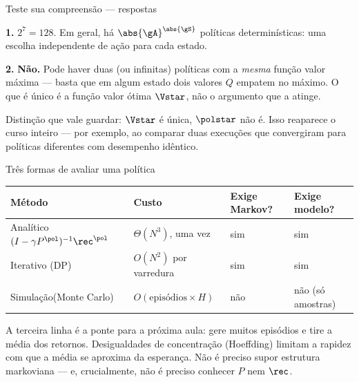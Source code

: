 \documentclass[aspectratio=169, 11pt]{beamer}
\begin{document}
\begin{frame}{Teste sua compreensão --- respostas}
  \begin{respbox}
    \textbf{1.} $2^7 = 128$. Em geral, há $\abs{\gA}^{\abs{\gS}}$ políticas
    determinísticas: uma escolha independente de ação para cada estado.

    \smallskip
    \textbf{2.} \textbf{Não.} Pode haver duas (ou infinitas) políticas com a
    \emph{mesma} função valor máxima --- basta que em algum estado dois valores $Q$
    empatem no máximo. O que é único é a \alert{função valor ótima} $\Vstar$, não o
    argumento que a atinge.
  \end{respbox}
  \begin{ideiabox}
    Distinção que vale guardar: $\Vstar$ é única, $\polstar$ não é. Isso reaparece o curso
    inteiro --- por exemplo, ao comparar duas execuções que convergiram para políticas
    diferentes com desempenho idêntico.
  \end{ideiabox}
\end{frame}

\begin{frame}{Três formas de avaliar uma política}
  \begin{center}
  {\small
  \begin{tabular}{@{}p{3.0cm}p{3.4cm}p{3.0cm}p{3.4cm}@{}}
    \toprule
    \textbf{Método} & \textbf{Custo} & \textbf{Exige Markov?} & \textbf{Exige modelo?} \\
    \midrule
    Analítico\newline $(I-\gamma P^{\pol})^{-1}\rec^{\pol}$
      & $\Theta(N^3)$, uma vez & sim & sim \\[0.4em]
    Iterativo (DP)
      & $O(N^2)$ por varredura & sim & sim \\[0.4em]
    Simulação\newline (Monte Carlo)
      & $O(\text{episódios} \times H)$ & \alert{não} & não (só amostras) \\
    \bottomrule
  \end{tabular}}
  \end{center}
  \vspace{0.3em}
  \begin{ideiabox}
    A terceira linha é a ponte para a próxima aula: gere muitos episódios e tire a média
    dos retornos. Desigualdades de concentração (Hoeffding) limitam a rapidez com que a
    média se aproxima da esperança. Não é preciso supor estrutura markoviana --- e,
    crucialmente, não é preciso conhecer $P$ nem $\rec$.
  \end{ideiabox}
\end{frame}
\end{document}
